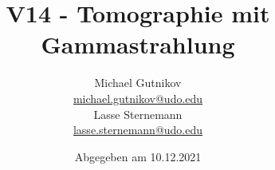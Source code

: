 

\title{V14 - Tomographie mit Gammastrahlung}
\author{
  Michael Gutnikov\\
  \href{mailto:michael.gutnikov@udo.edu}{michael.gutnikov@udo.edu}\\
  Lasse Sternemann\\
  \href{mailto:lasse.sternemann@udo.edu}{lasse.sternemann@udo.edu}
}
\date{Abgegeben am 10.12.2021}


    \maketitle
    \newpage
    \tableofcontents
    \newpage

    


    \newpage
    \printbibliography

